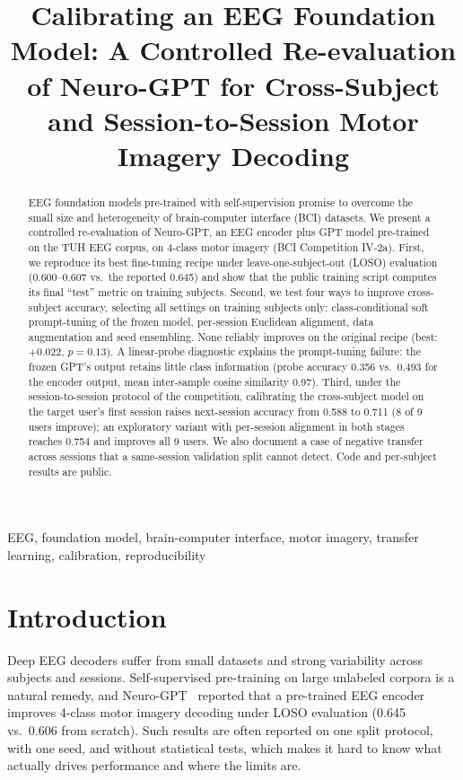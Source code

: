 \documentclass[conference]{IEEEtran}
\begin{document}
\title{Calibrating an EEG Foundation Model: A Controlled Re-evaluation of Neuro-GPT for Cross-Subject and Session-to-Session Motor Imagery Decoding}

\author{
}

\maketitle

\begin{abstract}
EEG foundation models pre-trained with self-supervision promise to overcome the small size and heterogeneity of
brain-computer interface (BCI) datasets. We present a controlled re-evaluation of Neuro-GPT, an EEG encoder plus GPT
model pre-trained on the TUH EEG corpus, on 4-class motor imagery (BCI Competition IV-2a). First, we reproduce its best
fine-tuning recipe under leave-one-subject-out (LOSO) evaluation (0.600--0.607 vs.\ the reported 0.645) and show that the
public training script computes its final ``test'' metric on training subjects. Second, we test four ways to improve
cross-subject accuracy, selecting all settings on training subjects only: class-conditional soft prompt-tuning of the
frozen model, per-session Euclidean alignment, data augmentation and seed ensembling. None reliably improves on the
original recipe (best: $+0.022$, $p=0.13$). A linear-probe diagnostic explains the prompt-tuning failure: the frozen GPT's
output retains little class information (probe accuracy 0.356 vs.\ 0.493 for the encoder output, mean inter-sample
cosine similarity 0.97). Third, under the session-to-session protocol of the competition, calibrating the cross-subject
model on the target user's first session raises next-session accuracy from 0.588 to 0.711 (8 of 9 users improve);
an exploratory variant with per-session alignment in both stages reaches 0.754 and improves all 9 users. We
also document a case of negative transfer across sessions that a same-session validation split cannot detect. Code and
per-subject results are public.
\end{abstract}

\begin{IEEEkeywords}
EEG, foundation model, brain-computer interface, motor imagery, transfer learning, calibration, reproducibility
\end{IEEEkeywords}

\section{Introduction}
Deep EEG decoders suffer from small datasets and strong variability across subjects and sessions. Self-supervised
pre-training on large unlabeled corpora is a natural remedy, and Neuro-GPT~\cite{cui2024neurogpt} reported that a
pre-trained EEG encoder improves 4-class motor imagery decoding under LOSO evaluation (0.645 vs.\ 0.606 from scratch).
Such results are often reported on one split protocol, with one seed, and without statistical tests, which makes it
hard to know what actually drives performance and where the limits are.
\end{document}
